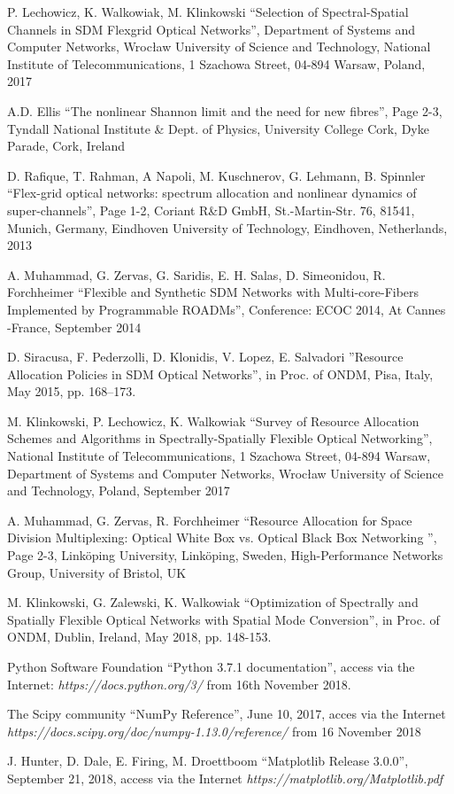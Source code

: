 \documentclass[conference]{IEEEtran}
\begin{document}
\begin{thebibliography}{00}

 P. Lechowicz, K. Walkowiak, M. Klinkowski ``Selection of Spectral-Spatial Channels in SDM
Flexgrid Optical Networks'', Department of Systems and Computer Networks, Wrocław University of Science and Technology, National Institute of Telecommunications, 1 Szachowa Street, 04-894 Warsaw, Poland, 2017

 A.D. Ellis ``The nonlinear Shannon limit and the need for new fibres'', Page 2-3, Tyndall National Institute \& Dept. of Physics, University College Cork, Dyke Parade, Cork, Ireland

 D. Rafique, T. Rahman, A Napoli, M. Kuschnerov, G. Lehmann, B. Spinnler ``Flex-grid optical networks: spectrum allocation and nonlinear dynamics of super-channels'', Page 1-2, Coriant R\&D GmbH, St.-Martin-Str. 76, 81541, Munich, Germany, Eindhoven University of Technology, Eindhoven, Netherlands, 2013

 A. Muhammad, G. Zervas, G. Saridis, E. H. Salas, D. Simeonidou, R. Forchheimer ``Flexible and Synthetic SDM Networks with Multi-core-Fibers Implemented by Programmable ROADMs'', Conference: ECOC 2014, At Cannes -France, September 2014

 D. Siracusa, F. Pederzolli, D. Klonidis, V. Lopez, E. Salvadori ''Resource Allocation Policies in
SDM Optical Networks'',  in Proc. of ONDM, Pisa, Italy, May 2015, pp. 168–173.

 M. Klinkowski, P. Lechowicz, K. Walkowiak ``Survey of Resource Allocation Schemes and Algorithms in Spectrally-Spatially Flexible Optical Networking'', National Institute of Telecommunications, 1 Szachowa Street, 04-894 Warsaw, Department of Systems and Computer Networks, Wrocław University of Science and Technology, Poland, September 2017

 A. Muhammad, G. Zervas, R. Forchheimer ``Resource Allocation for Space Division Multiplexing: Optical White Box vs. Optical Black Box Networking '', Page 2-3, Linköping University, Linköping, Sweden, High-Performance Networks Group, University of Bristol, UK

 M. Klinkowski, G. Zalewski, K. Walkowiak ``Optimization of Spectrally and Spatially Flexible Optical Networks with Spatial Mode Conversion'', in Proc. of ONDM, Dublin, Ireland, May 2018, pp. 148-153.

 Python Software Foundation ``Python 3.7.1 documentation'', access via the Internet: \textit{https://docs.python.org/3/} from 16th November 2018.

 The Scipy community ``NumPy Reference'', June 10, 2017, acces via the Internet \textit{https://docs.scipy.org/doc/numpy-1.13.0/reference/} from 16 November 2018

 J. Hunter, D. Dale, E. Firing, M. Droettboom ``Matplotlib Release 3.0.0'', September 21, 2018, access via the Internet \textit{https://matplotlib.org/Matplotlib.pdf}


\end{thebibliography}
\vspace{12pt}
\end{document}
